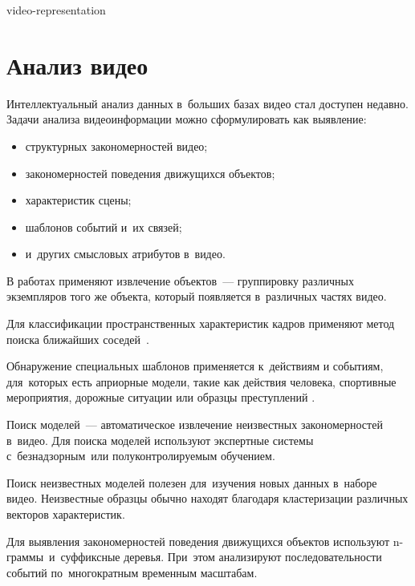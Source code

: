 \begin{figuredt}
    {video-representation}
\end{figuredt}


\section{Анализ видео}

Интеллектуальный анализ данных в~больших базах видео стал доступен недавно.
Задачи анализа видеоинформации можно сформулировать как выявление:
\begin{itemize}
    \item структурных закономерностей видео;
    \item закономерностей поведения движущихся объектов;
    \item характеристик сцены;
    \item шаблонов событий и~их связей;
    \item и~других смысловых атрибутов в~видео.
\end{itemize}

В работах применяют извлечение объектов~— группировку различных экземпляров
того же объекта, который появляется в~различных частях видео.

Для классификации пространственных характеристик кадров применяют
метод поиска ближайших соседей\
\cite{Anjulan:2009}.

Обнаружение специальных шаблонов применяется к~действиям и событиям,
для~которых есть априорные модели, такие как действия человека,
спортивные мероприятия, дорожные ситуации
или образцы преступлений \cite{Quack:2006}.

Поиск моделей~— автоматическое извлечение неизвестных закономерностей в~видео.
Для поиска моделей используют экспертные системы
с~безнадзорным\
или полуконтролируемым обучением.

Поиск неизвестных моделей полезен
для~изучения новых данных в~наборе видео.
Неизвестные образцы обычно находят благодаря
кластеризации различных векторов характеристик.

Для выявления закономерностей поведения движущихся объектов
используют n-граммы\ и~суффиксные
деревья\index{Суффиксное дерево}.
При~этом анализируют последовательности событий
по~многократным временным масштабам.


